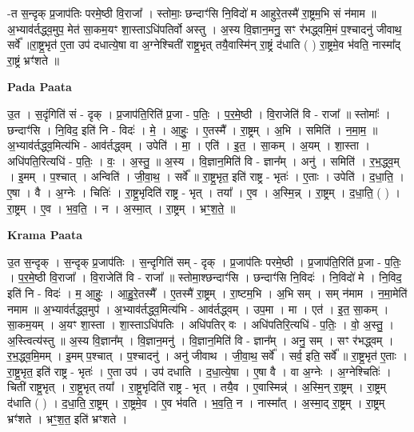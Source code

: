 \documentclass[17pt]{extarticle}
\begin{document}
-त स॒न्दृक् प्र॒जाप॑तिः परमे॒ष्ठी वि॒राजा᳚ । स्तोमाः॒ छन्दाꣳ॑सि नि॒विदो॑ म आहुरे॒तस्मै॑ रा॒ष्ट्रम॒भि सं न॑माम ॥अ॒भ्याव॑र्तद्ध्व॒मुप॒ मेत॑ सा॒कम॒यꣳ शा॒स्ताऽधि॑पतिर्वो अस्तु । अ॒स्य वि॒ज्ञान॒मनु॒ सꣳ र॑भद्ध्वमि॒मं प॒श्चादनु॑ जीवाथ॒ सर्वे᳚ ॥रा॒ष्ट्र॒भृत॑ ए॒ता उप॑ दधात्ये॒षा वा अ॒ग्नेश्चिती॑ राष्ट्र॒भृत् तयै॒वास्मि॑न् रा॒ष्ट्रं द॑धाति ( ) रा॒ष्ट्रमे॒व भ॑वति॒ नास्मा᳚द् रा॒ष्ट्रं भ्रꣳ॑शते ॥ \newline

\textbf{Pada Paata} \newline

उ॒त । स॒दृंगिति॑ सं - दृक् । प्र॒जाप॑ति॒रिति॑ प्र॒जा - प॒तिः॒ । प॒र॒मे॒ष्ठी । वि॒राजेति॑ वि - राजा᳚ ॥ स्तोमाः᳚ । छन्दाꣳ॑सि । नि॒विद॒ इति॑ नि - विदः॑ । मे॒ । आ॒हुः॒ । ए॒तस्मै᳚ । रा॒ष्ट्रम् । अ॒भि । समिति॑ । न॒मा॒म॒ ॥ अ॒भ्याव॑र्तद्ध्व॒मित्य॑भि - आव॑र्तद्ध्वम् । उपेति॑ । मा॒ । एति॑ । इ॒त॒ । सा॒कम् । अ॒यम् । शा॒स्ता । अधि॑पति॒रित्यधि॑ - प॒तिः॒ । वः॒ । अ॒स्तु॒ ॥ अ॒स्य । वि॒ज्ञान॒मिति॑ वि - ज्ञान᳚म् । अनु॑ । समिति॑ । र॒भ॒द्ध्व॒म् । इ॒मम् । प॒श्चात् । अन्विति॑ । जी॒वा॒थ॒ । सर्वे᳚ ॥ रा॒ष्ट्र॒भृत॒ इति॑ राष्ट्र - भृतः॑ । ए॒ताः । उपेति॑ । द॒धा॒ति॒ । ए॒षा । वै । अ॒ग्नेः । चितिः॑ । रा॒ष्ट्र॒भृदिति॑ राष्ट्र - भृत् । तया᳚ । ए॒व । अ॒स्मि॒न्न् । रा॒ष्ट्रम् । द॒धा॒ति॒ ( ) । रा॒ष्ट्रम् । ए॒व । भ॒व॒ति॒ । न । अ॒स्मा॒त् । रा॒ष्ट्रम् । भ्रꣳ॒॒श॒ते॒ ॥  \newline


\textbf{Krama Paata} \newline

उ॒त स॒न्दृक् । स॒न्दृक् प्र॒जाप॑तिः । स॒न्दृगिति॑ सम् - दृक् । प्र॒जाप॑तिः परमे॒ष्ठी । प्र॒जाप॑ति॒रिति॑ प्र॒जा - प॒तिः॒ । प॒र॒मे॒ष्ठी वि॒राजा᳚ । वि॒राजेति॑ वि - राजा᳚ ॥ स्तोमा॒श्छन्दाꣳ॑सि । छन्दाꣳ॑सि नि॒विदः॑ । नि॒विदो॑ मे । नि॒विद॒ इति॑ नि - विदः॑ । म॒ आ॒हुः॒ । आ॒हु॒रे॒तस्मै᳚ । ए॒तस्मै॑ रा॒ष्ट्रम् । रा॒ष्टम॒भि । अ॒भि सम् । सम् न॑माम । न॒मा॒मेति॑ नमाम ॥ अ॒भ्याव॑र्तद्ध्व॒मुप॑ । अ॒भ्याव॑र्तद्ध्व॒मित्य॑भि - आव॑र्तद्ध्वम् । उप॒मा । मा । एत॑ । इ॒त॒ सा॒कम् । सा॒कम॒यम् । अ॒यꣳ शा॒स्ता । शा॒स्ताऽधि॑पतिः । अधि॑पतिर् वः । अधि॑पतिरि॒त्यधि॑ - प॒तिः॒ । वो॒ अ॒स्तु॒ । अ॒स्त्वित्य॑स्तु ॥ अ॒स्य वि॒ज्ञान᳚म् । वि॒ज्ञान॒मनु॑ । वि॒ज्ञान॒मिति॑ वि - ज्ञान᳚म् । अनु॒ सम् । सꣳ र॑भद्ध्वम् । र॒भ॒द्ध्व॒मि॒मम् । इ॒मम् प॒श्चात् । प॒श्चादनु॑ । अनु॑ जीवाथ । जी॒वा॒थ॒ सर्वे᳚ । सर्व॒ इति॒ सर्वे᳚ ॥ रा॒ष्ट्र॒भृत॑ ए॒ताः । रा॒ष्ट्र॒भृत॒ इति॑ राष्ट्र - भृतः॑ । ए॒ता उप॑ । उप॑ दधाति । द॒धा॒त्ये॒षा । ए॒षा वै । वा अ॒ग्नेः । अ॒ग्नेश्चितिः॑ । चिती॑ राष्ट्र॒भृत् । रा॒ष्ट्र॒भृत् तया᳚ । रा॒ष्ट्र॒भृदिति॑ राष्ट्र - भृत् । तयै॒व । ए॒वास्मिन्न्॑ । अ॒स्मि॒न् रा॒ष्ट्रम् । रा॒ष्ट्रम् द॑धाति ( ) । द॒धा॒ति॒ रा॒ष्ट्रम् । रा॒ष्ट्रमे॒व । ए॒व भ॑वति । भ॒व॒ति॒ न । नास्मा᳚त् । अ॒स्मा॒द् रा॒ष्ट्रम् । रा॒ष्ट्रम् भ्रꣳ॑शते । भ्रꣳ॒॒श॒त॒ इति॑ भ्रꣳशते । \newline
\end{document}
